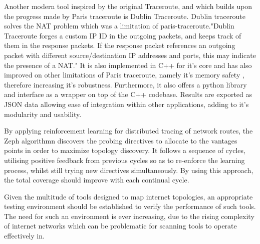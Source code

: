 Another modern tool inspired by the original Traceroute, and which builds upon the progress made by Paris traceroute is Dublin Traceroute. Dublin traceroute solves the NAT problem which was a limitation of paris-traceroute."Dublin Traceroute forges a custom IP ID in the outgoing packets, and keeps track of them in the response packets. If the response packet references an outgoing packet with different source/destination IP addresses and ports, this may indicate the presence of a NAT." \cite{dublin} \cite{dublin_website} It is also implemented in C++ for it's core and has also improved on other limitations of Paris traceroute, namely it's memory safety \cite{dublin}, therefore increasing it's robustness. Furthermore, it also offers a python library and interface as a wrapper on top of the C++ codebase. Results are exported as JSON data allowing ease of integration within other applications, adding to it's modularity and usability. \cite{dublin_website}

By applying reinforcement learning for distributed tracing of network routes, the Zeph algorithmn discovers the probing directives to allocate to the vantages points in order to maximize topology discovery. It follows a sequence of cycles, utilising positive feedback from previous cycles so as to re-enforce the learning process, whilst still trying new directives simultaneously. By using this approach, the total coverage should improve with each continual cycle. \cite{zephMap}

Given the multitude of tools designed to map internet topologies, an appropriate testing environment should be established to verify the performance of such tools. The need for such an environment is ever increasing, due to the rising complexity of internet networks which can be problematic for scanning tools to operate effectively in. 

